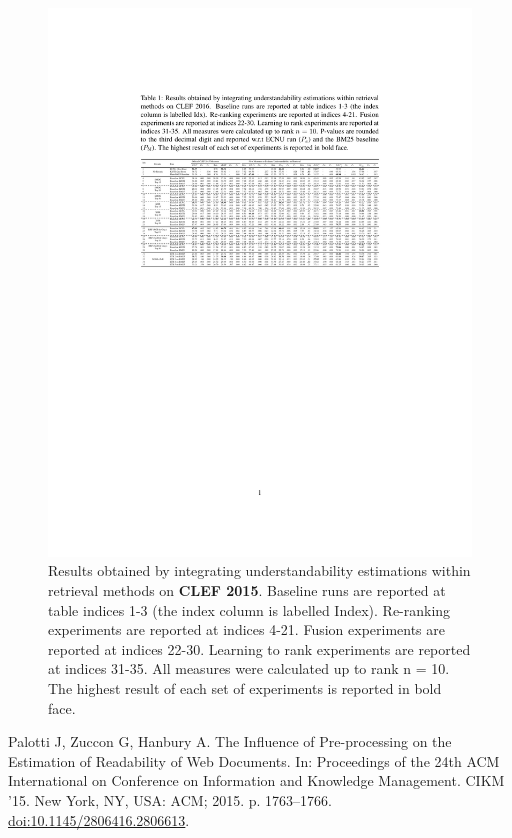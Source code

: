 \documentclass[10pt,a4paper]{article}
\begin{document}
\begin{figure}[h!]
	\centering
	\includegraphics[width=1.0\textwidth]{appendix/results_clef15}
    \caption{Results obtained by integrating understandability estimations within retrieval methods on \textbf{CLEF 2015}. Baseline runs
        are reported at table indices 1-3 (the index column is labelled Index). Re-ranking experiments are reported at indices 4-21. Fusion
        experiments are reported at indices 22-30. Learning to rank experiments are reported at indices 31-35. All measures were
        calculated up to rank n = 10. The highest result of each set of experiments is reported in bold face.}
	\label{fig:dist}
\end{figure}

\newpage
\begin{thebibliography}{1}
	
	Palotti J, Zuccon G, Hanbury A.
	\newblock The Influence of Pre-processing on the Estimation of Readability of
	Web Documents.
	\newblock In: Proceedings of the 24th ACM International on Conference on
	Information and Knowledge Management. CIKM '15. New York, NY, USA: ACM; 2015.
	p. 1763--1766.
	\newblock \href {http://dx.doi.org/10.1145/2806416.2806613}
	{doi:10.1145/2806416.2806613}.
	
\end{thebibliography}
\end{document}

